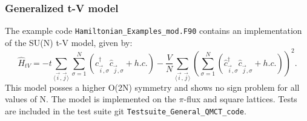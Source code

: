 \subsubsection{ Generalized t-V model }

The example code \texttt{Hamiltonian\_Examples\_mod.F90}   contains  an implementation of the SU(N)  t-V model, given by: 
\begin{equation}
	  \hat{H}_{tV} =   
	   -  t  \sum_{\langle \vec{i}, \vec{j} \rangle}   \sum_{\sigma =1}^{N} 
	  \left( \hat{c}^{\dagger}_{\vec{i},\sigma} \hat{c}^{\phantom{\dagger}}_{\vec{j},\sigma}    + h.c. \right)    -\frac{V}{N}  \sum_{\langle \vec{i}, \vec{j} \rangle} 
	   \left( \sum_{\sigma =1}^{N} 
	  \left( \hat{c}^{\dagger}_{\vec{i},\sigma} \hat{c}^{\phantom{\dagger}}_{\vec{j},\sigma}    + h.c. \right)  \right)^2. 
\end{equation}
This model  posses a higher O(2N) symmetry and shows no sign problem  for all values of N.   The model  is implemented on the $\pi$-flux and  square lattices. Tests are included in the test suite git \texttt{Testsuite\_General\_QMCT\_code}.


